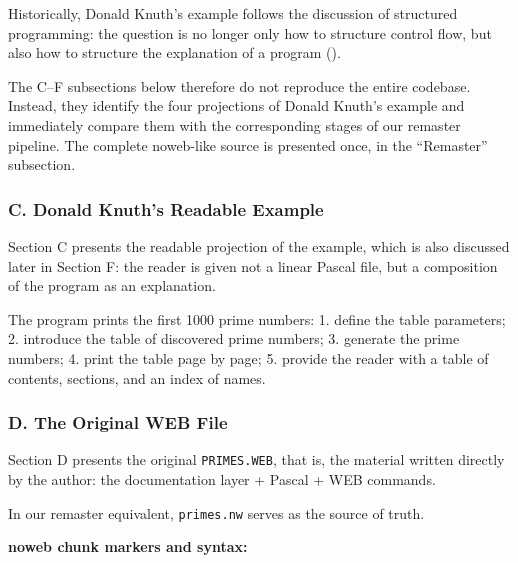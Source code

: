 \documentclass{ZGJournalArticle_2026}
\newenvironment{Shaded}{}{}
\newcommand{\NormalTok}[1]{#1}
\begin{document}
Historically, Donald Knuth's example follows the discussion of
structured programming: the question is no longer only how to structure
control flow, but also how to structure the explanation of a program
().

The C--F subsections below therefore do not reproduce the entire
codebase. Instead, they identify the four projections of Donald Knuth's
example and immediately compare them with the corresponding stages of
our remaster pipeline. The complete noweb-like source is presented once,
in the ``Remaster'' subsection.

\subsubsection{C. Donald Knuth's Readable
Example}\label{c.-donald-knuths-readable-example}

Section C presents the readable projection of the example, which is also
discussed later in Section F: the reader is given not a linear Pascal
file, but a composition of the program as an explanation.

\begin{Shaded}
\begin{Highlighting}[]
\NormalTok{The program prints the first 1000 prime numbers:}
\NormalTok{  1. define the table parameters;}
\NormalTok{  2. introduce the table of discovered prime numbers;}
\NormalTok{  3. generate the prime numbers;}
\NormalTok{  4. print the table page by page;}
\NormalTok{  5. provide the reader with a table of contents, sections, and an index of names.}
\end{Highlighting}
\end{Shaded}

\subsubsection{D. The Original WEB File}\label{d.-the-original-web-file}

Section D presents the original \texttt{PRIMES.WEB}, that is, the
material written directly by the author: the documentation layer +
Pascal + WEB commands.

In our remaster equivalent, \texttt{primes.nw} serves as the source of
truth.

\textbf{noweb chunk markers and syntax:}
\end{document}
